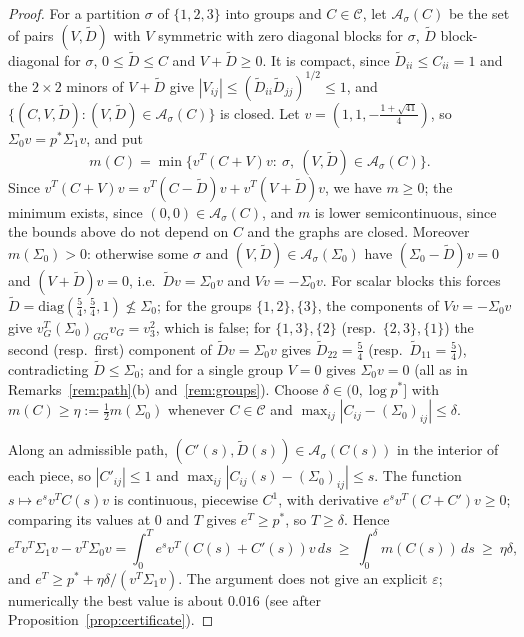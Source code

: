 \documentclass[11pt]{amsart}
\theoremstyle{definition}
\begin{document}
\begin{proof}
For a partition $\sigma$ of $\{1,2,3\}$ into groups and $C\in\mathcal C$, let $\mathcal A_\sigma(C)$ be the set of pairs
$(V,\tilde D)$ with $V$ symmetric with zero diagonal blocks for $\sigma$, $\tilde D$ block-diagonal for $\sigma$,
$0\le\tilde D\le C$ and $V+\tilde D\ge0$. It is compact, since $\tilde D_{ii}\le C_{ii}=1$ and the $2\times2$ minors of
$V+\tilde D$ give $|V_{ij}|\le(\tilde D_{ii}\tilde D_{jj})^{1/2}\le1$, and $\{(C,V,\tilde D):(V,\tilde D)\in\mathcal A_\sigma(C)\}$
is closed. Let $v=(1,1,-\frac{1+\sqrt{41}}4)$, so $\Sigma_0v=p^*\Sigma_1v$, and put
\[
m(C)=\min\big\{v^T(C+V)v:\ \sigma,\ (V,\tilde D)\in\mathcal A_\sigma(C)\big\}.
\]
Since $v^T(C+V)v=v^T(C-\tilde D)v+v^T(V+\tilde D)v$, we have $m\ge0$; the minimum exists, since $(0,0)\in\mathcal A_\sigma(C)$, and $m$ is lower semicontinuous, since the
bounds above do not depend on $C$ and the graphs are closed.
Moreover $m(\Sigma_0)>0$: otherwise some $\sigma$ and $(V,\tilde D)\in\mathcal A_\sigma(\Sigma_0)$ have $(\Sigma_0-\tilde D)v=0$
and $(V+\tilde D)v=0$, i.e.\ $\tilde Dv=\Sigma_0v$ and $Vv=-\Sigma_0v$. For scalar blocks this forces
$\tilde D=\mathrm{diag}(\frac54,\frac54,1)\not\le\Sigma_0$; for the groups $\{1,2\},\{3\}$, the components of
$Vv=-\Sigma_0v$ give $v_G^T(\Sigma_0)_{GG}v_G=v_3^2$, which is false; for $\{1,3\},\{2\}$ (resp.\ $\{2,3\},\{1\}$) the second
(resp.\ first) component of $\tilde Dv=\Sigma_0v$ gives $\tilde D_{22}=\frac54$ (resp.\ $\tilde D_{11}=\frac54$),
contradicting $\tilde D\le\Sigma_0$; and for a single group $V=0$
gives $\Sigma_0v=0$ (all as in Remarks~\ref{rem:path}(b) and~\ref{rem:groups}). Choose $\delta\in(0,\log p^*]$ with
$m(C)\ge\eta:=\frac12m(\Sigma_0)$ whenever $C\in\mathcal C$ and $\max_{ij}|C_{ij}-(\Sigma_0)_{ij}|\le\delta$.

Along an admissible path, $(C'(s),\tilde D(s))\in\mathcal A_\sigma(C(s))$ in the interior of each piece, so
$|C'_{ij}|\le1$ and $\max_{ij}|C_{ij}(s)-(\Sigma_0)_{ij}|\le s$. The function $s\mapsto e^sv^TC(s)v$ is continuous,
piecewise $C^1$, with derivative $e^sv^T(C+C')v\ge0$; comparing its values at $0$ and $T$ gives $e^T\ge p^*$, so
$T\ge\delta$. Hence
\[
e^Tv^T\Sigma_1v-v^T\Sigma_0v=\int_0^Te^sv^T(C(s)+C'(s))v\,ds\ \ge\ \int_0^\delta m(C(s))\,ds\ \ge\ \eta\delta ,
\]
and $e^T\ge p^*+\eta\delta/(v^T\Sigma_1v)$. The argument does not give an explicit $\varepsilon$; numerically the best
value is about $0.016$ (see after Proposition~\ref{prop:certificate}).
\end{proof}
\end{document}
